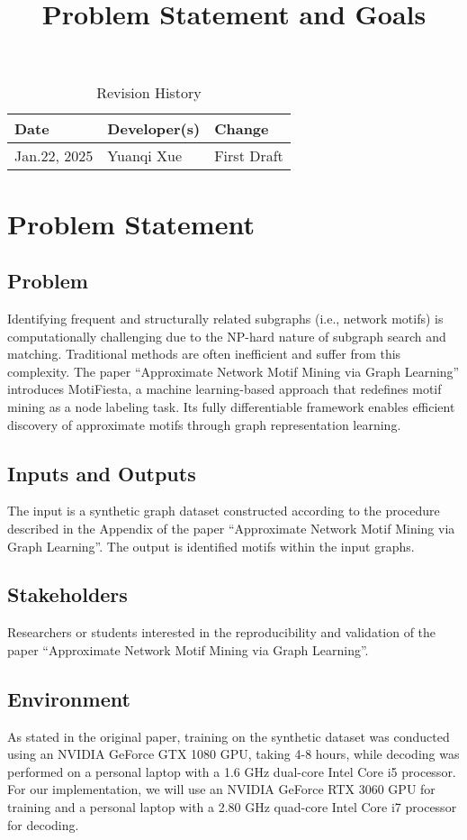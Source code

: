\documentclass{article}
\title{Problem Statement and Goals\\\progname}
\author{\authname}
\date{}
\begin{document}
\maketitle

\begin{table}[hp]
\caption{Revision History} \label{TblRevisionHistory}
\begin{tabularx}{\textwidth}{llX}
\toprule
\textbf{Date} & \textbf{Developer(s)} & \textbf{Change}\\
\midrule
Jan.22, 2025 & Yuanqi Xue & First Draft\\
\bottomrule
\end{tabularx}
\end{table}

\section{Problem Statement}
\subsection{Problem}
Identifying frequent and structurally related subgraphs (i.e., network motifs) is computationally challenging due to the NP-hard nature of subgraph search and matching. Traditional methods are often inefficient and suffer from this complexity. The paper “Approximate Network Motif Mining via Graph Learning” introduces MotiFiesta, a machine learning-based approach that redefines motif mining as a node labeling task. Its fully differentiable framework enables efficient discovery of approximate motifs through graph representation learning.

\subsection{Inputs and Outputs}
The input is a synthetic graph dataset constructed according to the procedure described in the Appendix of the paper “Approximate Network Motif Mining via Graph Learning”. The output is identified motifs within the input graphs.


\subsection{Stakeholders}
Researchers or students interested in the reproducibility and validation of the paper “Approximate Network Motif Mining via Graph Learning”.

\subsection{Environment}
As stated in the original paper, training on the synthetic dataset was conducted using an NVIDIA GeForce GTX 1080 GPU, taking 4-8 hours, while decoding was performed on a personal laptop with a 1.6 GHz dual-core Intel Core i5 processor. For our implementation, we will use an NVIDIA GeForce RTX 3060 GPU for training and a personal laptop with a 2.80 GHz quad-core Intel Core i7 processor for decoding.
\end{document}
